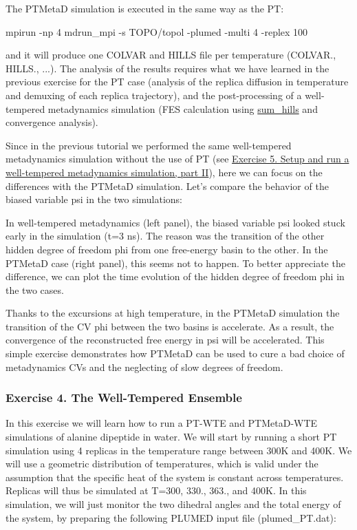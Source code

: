 The P\+T\+Meta\+D simulation is executed in the same way as the P\+T\+:

\begin{DoxyVerb} mpirun -np 4 mdrun_mpi -s TOPO/topol -plumed -multi 4 -replex 100
\end{DoxyVerb}


and it will produce one C\+O\+L\+V\+A\+R and H\+I\+L\+L\+S file per temperature (C\+O\+L\+V\+A\+R., H\+I\+L\+L\+S., ...). The analysis of the results requires what we have learned in the previous exercise for the P\+T case (analysis of the replica diffusion in temperature and demuxing of each replica trajectory), and the post-\/processing of a well-\/tempered metadynamics simulation (F\+E\+S calculation using \hyperlink{sum_hills}{sum\+\_\+hills} and convergence analysis).

Since in the previous tutorial we performed the same well-\/tempered metadynamics simulation without the use of P\+T (see \hyperlink{belfast-6_belfast-6-exercise-5}{Exercise 5. Setup and run a well-\/tempered metadynamics simulation, part I\+I}), here we can focus on the differences with the P\+T\+Meta\+D simulation. Let's compare the behavior of the biased variable psi in the two simulations\+:

\label{belfast-7_belfast-7-ptmetadh-fig}%
\hypertarget{belfast-7_belfast-7-ptmetadh-fig}{}%
 In well-\/tempered metadynamics (left panel), the biased variable psi looked stuck early in the simulation (t=3 ns). The reason was the transition of the other hidden degree of freedom phi from one free-\/energy basin to the other. In the P\+T\+Meta\+D case (right panel), this seems not to happen. To better appreciate the difference, we can plot the time evolution of the hidden degree of freedom phi in the two cases.

\label{belfast-7_belfast-7-ptmetadhidd-fig}%
\hypertarget{belfast-7_belfast-7-ptmetadhidd-fig}{}%
 Thanks to the excursions at high temperature, in the P\+T\+Meta\+D simulation the transition of the C\+V phi between the two basins is accelerate. As a result, the convergence of the reconstructed free energy in psi will be accelerated. This simple exercise demonstrates how P\+T\+Meta\+D can be used to cure a bad choice of metadynamics C\+Vs and the neglecting of slow degrees of freedom.\hypertarget{belfast-7_belfast-7-exercise-4}{}\subsubsection{Exercise 4. The Well-\/\+Tempered Ensemble}\label{belfast-7_belfast-7-exercise-4}
In this exercise we will learn how to run a P\+T-\/\+W\+T\+E and P\+T\+Meta\+D-\/\+W\+T\+E simulations of alanine dipeptide in water. We will start by running a short P\+T simulation using 4 replicas in the temperature range between 300\+K and 400\+K. We will use a geometric distribution of temperatures, which is valid under the assumption that the specific heat of the system is constant across temperatures. Replicas will thus be simulated at T=300, 330., 363., and 400\+K. In this simulation, we will just monitor the two dihedral angles and the total energy of the system, by preparing the following P\+L\+U\+M\+E\+D input file (plumed\+\_\+\+P\+T.\+dat)\+:

